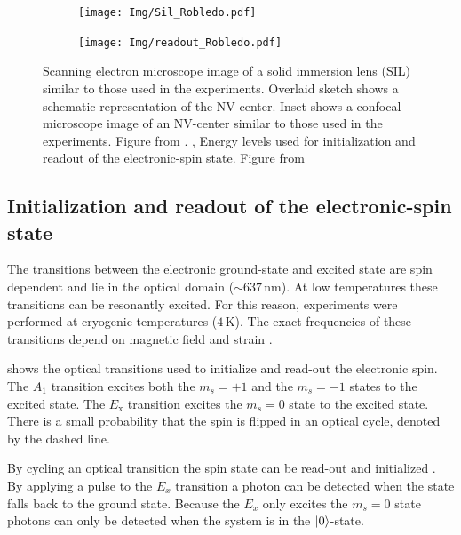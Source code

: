 \begin{figure}[htbp]
    \centering
    \begin{subfigure}[t]{0.49\textwidth}\centering
        \caption{}
        \label{fig:Sil_Robledo}
        \texttt{[image: Img/Sil\_Robledo.pdf]}
    \end{subfigure}
    \begin{subfigure}[t]{0.49\textwidth}\centering
       \caption{}
       \label{fig:readoutRobledo}
       \texttt{[image: Img/readout\_Robledo.pdf]}
   \end{subfigure}
   \caption{\textbf{} Scanning electron microscope image of a solid immersion lens (SIL) similar to those used in the experiments. Overlaid sketch shows a schematic representation of the NV-center. Inset shows a confocal microscope image of an NV-center similar to those used in the experiments. Figure from \citet{Robledo2011HighFidelity}.  \textbf{}, Energy levels used for initialization and readout of the electronic-spin state. Figure from \citet{Robledo2011HighFidelity}}
\end{figure}

\subsection{Initialization and readout of the electronic-spin state}
The transitions between the electronic ground-state and excited state are spin dependent and lie in the optical domain ($\sim 637\, \mathrm{ nm}$).
At low temperatures these transitions can be resonantly excited.
For this reason, experiments were performed at cryogenic temperatures ($4\,\mathrm{K}$).
The exact frequencies of these transitions depend on magnetic field and strain \citep{Hensen2011MeasurementBased}.

 shows the optical transitions used to initialize and read-out the electronic spin.
The $A_1$ transition excites both the $m_s =+1$ and the $m_s=-1$ states to the excited state.
The $E_\mathrm{x}$ transition excites the $m_s = 0$ state to the excited state.
There is a small probability that the spin is flipped in an optical cycle, denoted by the dashed line.

By cycling an optical transition the spin state can be read-out and initialized \citep{Robledo2011HighFidelity}.
By applying a pulse to the $E_x$ transition a photon can be detected when the state falls back to the ground state.
Because the $E_x$ only excites the $m_s=0$ state photons can only be detected when the system is in the ${\left\vert{0}\right\rangle}$-state.

